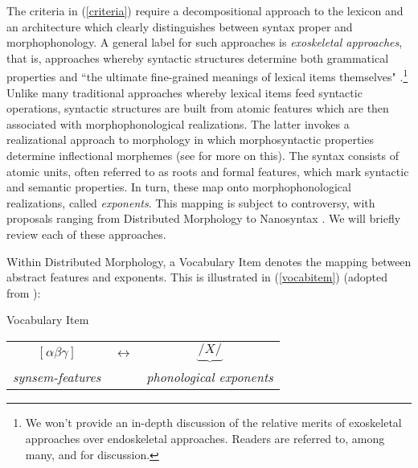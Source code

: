 \documentclass[output=paper,colorlinks,citecolor=brown,footheight=42pt]{langscibook}
\begin{document}
The criteria in  (\ref{criteria}) require a decompositional approach to the lexicon and an architecture which clearly distinguishes between syntax proper and morphophonology. A general label for such approaches is {\itshape exoskeletal approaches}, that is, approaches whereby syntactic structures determine both grammatical properties and “the ultimate fine-grained meanings of lexical items themselves" \citep[33]{borer2003}.\footnote{We won't provide an in-depth discussion of the relative merits of exoskeletal approaches over endoskeletal approaches. Readers are referred to, among many, \citet{borer2005nouns, borer2005events, lohndal2014, lohndal2019} and \citet{wechsler2021} for discussion.} Unlike many traditional approaches whereby lexical items feed syntactic operations, syntactic structures are built from atomic features which are then associated with morphophonological realizations. The latter invokes a realizational approach to morphology in which morphosyntactic properties determine inflectional morphemes (see \citealt{stump2001} for more on this). The syntax consists of atomic units, often referred to as roots and formal features, which mark syntactic and semantic properties. In turn, these map onto morphophonological realizations, called {\itshape exponents}. This mapping is subject to controversy, with proposals ranging from Distributed Morphology \citep{halle1993} to Nanosyntax \citep{starke2009}. We will briefly review each of these approaches.

Within Distributed Morphology, a Vocabulary Item denotes the mapping between abstract features and exponents. This is illustrated in (\ref{vocabitem}) (adopted from \citealt[9]{embick2015}):

\begin{exe}
\ex \label{vocabitem} Vocabulary Item
\begin{tabular}{ccc}
$[\alpha\beta\gamma]$ &  $\longleftrightarrow$ & $\underbrace{/X/}$\\
\textit{synsem-features} & & \textit{phonological exponents}\\ 
\end{tabular}  

\end{exe}
\end{document}
